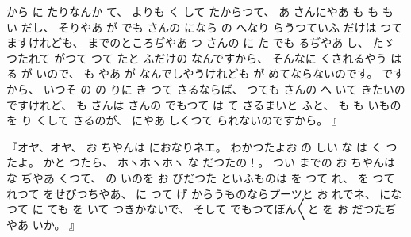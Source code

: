 から
に
たりなんか
て、
%
よりも
く
して
たからつて、
%
あ
さんにやあ
も
も
も
い
だし、
%
そりやあ
が
でも
さんの
になら
の
へなり
らうつていふ
だけは
つて
ますけれども、
%
までのところぢやあ
つ
さんの
に
た
でも
るぢやあ
し、
%
たゞ
つたれて
がつて
つて
たと
ふだけの
なんですから、
%
そんなに
くされるやう
は
る
が
いので、
%
も
やあ
が
なんでしやうけれども
が
めてならないのです。
%
ですから、
%
いつそ
の
の
りに
き
つて
さるならば、
%
つても
さんの
へ
いて
きたいのですけれど、
%
も
さんは
さんの
でもつて
は
て
さるまいと
ふと、
%
も
も
いものを
り
くして
さるのが、
%
にやあ
しくつて
られないのですから。
』

『オヤ、オヤ、
%
お
ちやんは
におなりネエ。
%
わかつたよお
の
しい
な
は
く
つたよ。
%
かと
つたら、
%
ホヽホヽホヽ
な
だつたの！。
%
つい
までの
お
ちやんは
な
ぢやあ
くつて、
%
の
いのを
お
びだつた
といふものは
を
つて
れ、
%
を
つて
れつて
をせびつちやあ、
%
に
つて
げ
からうものならプーツと
お
れでネ、
%
になつて
に
ても
を
いて
つきかないで、
%
そして
でもつてぼん〳〵と
を
お
だつたぢやあ
いか。
』

